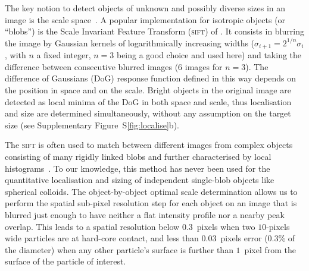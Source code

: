 \documentclass[reprint,notitlepage]{revtex4-1}
\begin{document}
The key notion to detect objects of unknown and possibly diverse sizes in an image is the scale space~\cite{Lindeberg1993}. A popular implementation for isotropic objects (or ``blobs'') is the Scale Invariant Feature Transform (\textsc{sift}) of \citet{Lowe2004}. It consists  in blurring the image by Gaussian kernels of logarithmically increasing widths ($\sigma_{i+1} = 2^{1/n} \sigma_i$, with $n$ a fixed integer, $n=3$ being a good choice and used here) and taking the difference between consecutive blurred images (6 images for $n=3$). The difference of Gaussians (DoG) response function defined in this way depends on the position in space and on the scale. Bright objects in the original image are detected as local minima of the DoG in both space and scale, thus localisation and size are determined simultaneously, without any assumption on the target size (see Supplementary Figure~S\ref{fig:localise}b).

The \textsc{sift} is often used to match between different images from complex objects consisting of many rigidly linked blobs and further characterised by local histograms~\citep{Lowe2004}. To our knowledge, this method has never been used for the quantitative localisation and sizing of independent single-blob objects like spherical colloids. The object-by-object optimal scale determination allows us to perform the spatial sub-pixel resolution step for each object on an image that is blurred just enough to have neither a flat intensity profile nor a nearby peak overlap. This leads to a spatial resolution below $0.3$~pixels when two $10$-pixels wide particles are at hard-core contact, and less than $0.03$~pixels error ($0.3\%$ of the diameter) when any other particle's surface is further than $1$~pixel from the surface of the particle of interest.
\end{document}
